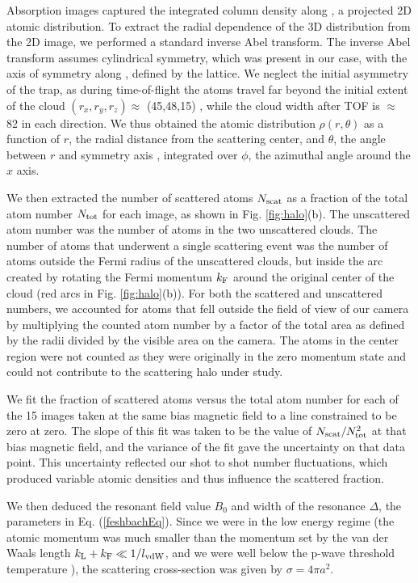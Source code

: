 \documentclass[12pt]{iopart}
\begin{document}
Absorption images captured the integrated column density along \ez{}, a projected 2D atomic distribution. To extract the radial dependence of the 3D distribution from the 2D image, we performed a standard inverse Abel transform. The inverse Abel transform assumes cylindrical symmetry, which was present in our case, with the axis of symmetry along \ex{}, defined by the lattice. We neglect the initial asymmetry of the trap, as during time-of-flight the atoms travel far beyond the initial extent of the cloud  $(r_x,r_y,r_z)\approx$ (45,48,15) \um{}, while the cloud width after TOF is $\approx$ 82 \um in each direction. We thus obtained the atomic distribution $\rho(r,\theta)$ as a function of $r$, the radial distance from the scattering center, and $\theta$, the angle between $r$ and symmetry axis \ex{}, integrated over $\phi$, the azimuthal angle around the $x$ axis.

We then extracted the number of scattered atoms $N_{\rm{scat}}$ as a fraction of the total atom number $N_{\rm{tot}}$ for each image, as shown in Fig. \ref{fig:halo}(b). The unscattered atom number was the number of atoms in the two unscattered clouds. The number of atoms that underwent a single scattering event was the number of atoms outside the Fermi radius of the unscattered clouds, but inside the arc created by rotating the Fermi momentum $k_{\rm{F}}$ around the original center of the cloud (red arcs in Fig. \ref{fig:halo}(b)). For both the scattered and unscattered numbers, we accounted for atoms that fell outside the field of view of our camera by multiplying the counted atom number by a factor of the total area as defined by the radii divided by the visible area on the camera. The atoms in the center region were not counted as they were originally in the zero momentum state and could not contribute to the scattering halo under study.

We fit the fraction of scattered atoms versus the total atom number for each of the 15 images taken at the same bias magnetic field to a line constrained to be zero at zero. The slope of this fit was taken to be the value of $N_{\rm{scat}}/N_{\rm{tot}}^2$ at that bias magnetic field, and the variance of the fit gave the uncertainty on that data point. This uncertainty reflected our shot to shot number fluctuations, which produced variable atomic densities and thus influence the scattered fraction. 

We then deduced the resonant field value $B_0$ and width of the resonance  $\Delta$, the parameters in Eq. (\ref{feshbachEq}).  Since we were in the low energy regime (the atomic momentum was much smaller than the momentum set by the van der Waals length $k_{\rm{L}}+k_{\rm{F}}\ll1/l_{\rm{vdW}}$, and we were well below the p-wave threshold temperature \cite{DeMarco99}), the scattering cross-section was given by $\sigma=4\pi a^2$.
\end{document}
